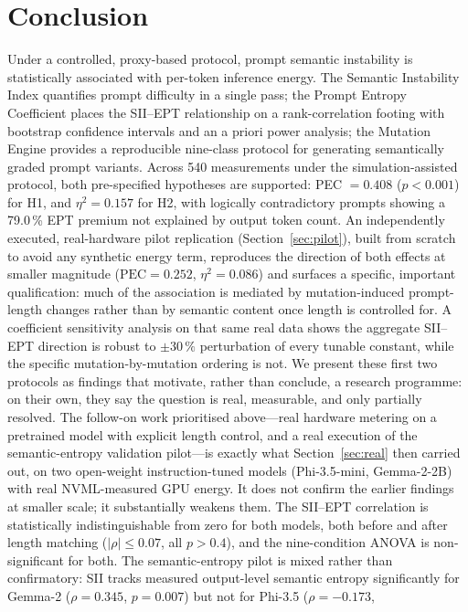 \documentclass[conference]{IEEEtran}
\begin{document}
\section{Conclusion}
Under a controlled, proxy-based protocol, prompt semantic instability
is statistically associated with per-token inference energy. The
Semantic Instability Index quantifies prompt difficulty in a single
pass; the Prompt Entropy Coefficient places the SII--EPT relationship
on a rank-correlation footing with bootstrap confidence intervals and
an a priori power analysis; the Mutation Engine provides a
reproducible nine-class protocol for generating semantically graded
prompt variants. Across 540 measurements under the simulation-assisted
protocol, both pre-specified hypotheses are supported: PEC $=0.408$
($p<0.001$) for H1, and $\eta^2=0.157$ for H2, with logically
contradictory prompts showing a 79.0\,\% EPT premium not explained by
output token count. An independently executed, real-hardware pilot
replication (Section~\ref{sec:pilot}), built from scratch to avoid any
synthetic energy term, reproduces the direction of both effects at
smaller magnitude ($\mathrm{PEC}=0.252$, $\eta^2=0.086$) and surfaces a
specific, important qualification: much of the association is
mediated by mutation-induced prompt-length changes rather than by
semantic content once length is controlled for. A coefficient
sensitivity analysis on that same real data shows the aggregate
SII--EPT direction is robust to $\pm 30\,\%$ perturbation of every
tunable constant, while the specific mutation-by-mutation ordering is
not. We present these first two protocols as findings that motivate,
rather than conclude, a research programme: on their own, they say
the question is real, measurable, and only partially resolved.
The follow-on work prioritised above---real hardware metering on a
pretrained model with explicit length control, and a real execution
of the semantic-entropy validation pilot---is exactly what
Section~\ref{sec:real} then carried out, on two open-weight
instruction-tuned models (Phi-3.5-mini, Gemma-2-2B) with real
NVML-measured GPU energy. It does not confirm the earlier findings at
smaller scale; it substantially weakens them. The SII--EPT correlation
is statistically indistinguishable from zero for both models, both
before and after length matching ($|\rho|\le 0.07$, all $p>0.4$), and
the nine-condition ANOVA is non-significant for both. The
semantic-entropy pilot is mixed rather than confirmatory: SII tracks
measured output-level semantic entropy significantly for Gemma-2
($\rho=0.345$, $p=0.007$) but not for Phi-3.5 ($\rho=-0.173$,
\end{document}
